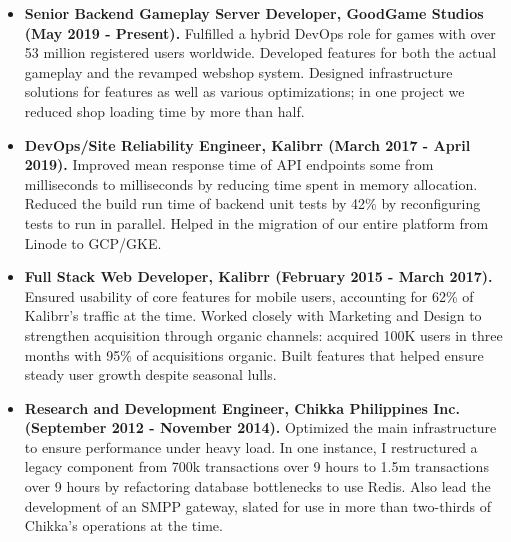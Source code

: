 \documentclass{article}
\begin{document}
    \begin{itemize}
      \item \textbf{Senior Backend Gameplay Server Developer, GoodGame Studios (May 2019 - Present).}
      Fulfilled a hybrid DevOps role for games with over 53 million registered
      users worldwide. Developed features for both the actual gameplay and the
      revamped webshop system. Designed infrastructure solutions for features as
      well as various optimizations; in one project we reduced shop loading time
      by more than half.
      

      \item \textbf{DevOps/Site Reliability Engineer, Kalibrr (March 2017 - April 2019).}
      Improved mean response time of API endpoints some from 
      milliseconds to  milliseconds by reducing time spent in memory
      allocation. Reduced the build run time of backend unit tests by 42\% by
      reconfiguring tests to run in parallel. Helped in the migration of our 
      entire platform from Linode to GCP/GKE.
      

      \item \textbf{Full Stack Web Developer, Kalibrr (February 2015 - March 2017).}
      Ensured usability of core features for mobile users, accounting for 62\% of Kalibrr's traffic
      at the time. Worked closely with Marketing and Design to strengthen acquisition
      through organic channels: acquired \ctilde100K users in three months with 95\% of
      acquisitions organic. Built features that helped ensure steady user growth despite seasonal lulls.

      
      \item \textbf{Research and Development Engineer, Chikka Philippines Inc. (September 2012 - November 2014).}
      Optimized the main infrastructure to ensure performance under heavy load.
      In one instance, I restructured a legacy component from \ctilde700k
      transactions over 9 hours to \ctilde1.5m transactions over 9 hours by
      refactoring database bottlenecks to use Redis. Also lead the development
      of an SMPP gateway, slated for use in more than two-thirds of Chikka's
      operations at the time.


\end{itemize}
\end{document}
